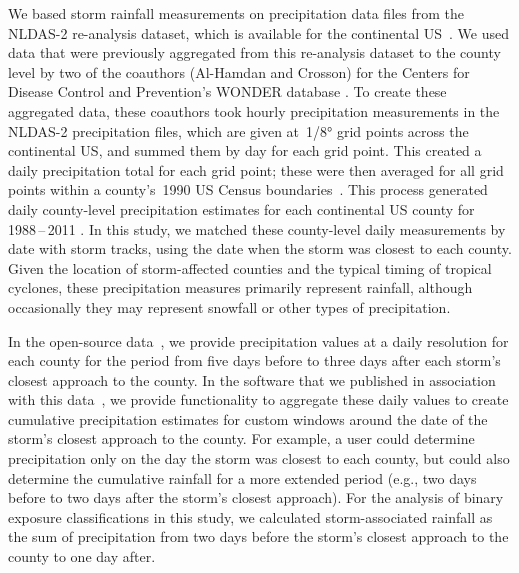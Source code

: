 We based storm rainfall measurements on precipitation data files from the
\ac{NLDAS-2} re-analysis dataset, which is available for the continental
\ac{US}~\parencite{rui2013nldas}. We used data that were previously aggregated
from this re-analysis dataset to the county level by two of the coauthors
(Al-Hamdan and Crosson) for the Centers for Disease Control and Prevention's
\ac{WONDER} database \parencite{cdcwonder, alhamdan2014environmental}. To
create these aggregated data, these coauthors took hourly precipitation
measurements in the \ac{NLDAS-2} precipitation files, which are given
at~1/8\si{\degree} grid points across the continental \ac{US}, and summed them
by day for each grid point.  This created a daily precipitation total for each
grid point; these were then averaged for all grid points within a county's~1990
\ac{US} Census boundaries~\parencite{alhamdan2014environmental, cdcwonder}.
This process generated daily county-level precipitation estimates for each
continental \ac{US} county for 1988\,--\,2011 \parencite{cdcwonder}.  In this
study, we matched these county-level daily measurements by date with storm
tracks, using the date when the storm was closest to each county. Given the
location of storm-affected counties and the typical timing of tropical
cyclones, these precipitation measures primarily represent rainfall, although
occasionally they may represent snowfall or other types of precipitation.  

In the open-source data~\parencite{hurricaneexposuredata}, we provide
precipitation values at a daily resolution for each county for the period from
five days before to three days after each storm's closest approach to the
county.  In the software that we published in association with this
data~\parencite{hurricaneexposure}, we provide functionality to aggregate these
daily values to create cumulative precipitation estimates for custom windows
around the date of the storm's closest approach to the county. For example, a
user could determine precipitation only on the day the storm was closest to
each county, but could also determine the cumulative rainfall for a more
extended period (e.g., two days before to two days after the storm's
closest approach). For the analysis of binary exposure classifications in this
study, we calculated storm-associated rainfall as the sum of precipitation from
two days before the storm's closest approach to the county to one day after.  

